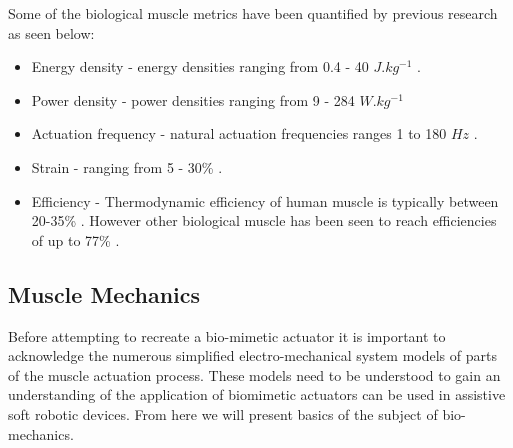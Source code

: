 Some of the biological muscle metrics have been quantified by previous research as seen below:
\begin{itemize}
    \item Energy density - energy densities ranging from 0.4 - 40 $J.kg^{-1}$ \citep{Alexander1977}.
    \item Power density - power densities ranging from 9 - 284 $W.kg^{-1}$ \citep{Full2004}
    \item Actuation frequency - natural actuation frequencies ranges 1 to 180 $Hz$ \citep{Full2004}.
    \item Strain - ranging from 5 - 30\% \citep{Duduta2019}.
    \item Efficiency - Thermodynamic efficiency of human muscle is typically between 20-35\% \citep{Smith2005}. However other biological muscle has been seen to reach efficiencies of up to 77\% \citep{Smith2005}.
\end{itemize}
    

\subsection{Muscle Mechanics}
Before attempting to recreate a bio-mimetic actuator it is important to acknowledge the numerous simplified electro-mechanical system models of parts of the muscle actuation process. These models need to be understood to gain an understanding of the application of biomimetic actuators can be used in assistive soft robotic devices. From here we will present basics of the subject of bio-mechanics.

